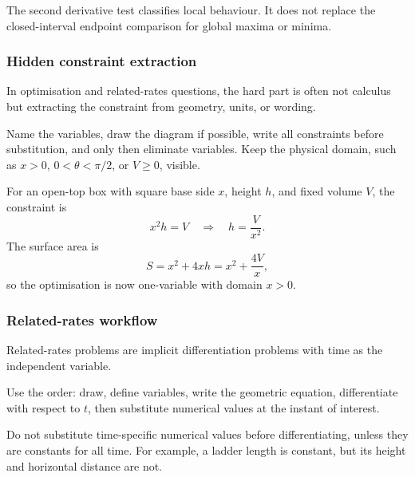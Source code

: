 \begin{commonmistake}
The second derivative test classifies local behaviour.  It does not replace the
closed-interval endpoint comparison for global maxima or minima.
\end{commonmistake}

\newpage
\subsubsection{Hidden constraint extraction}
\begin{extension}
In optimisation and related-rates questions, the hard part is often not
calculus but extracting the constraint from geometry, units, or wording.
\end{extension}

\begin{examtip}
Name the variables, draw the diagram if possible, write all constraints before
substitution, and only then eliminate variables.  Keep the physical domain, such
as \(x>0\), \(0<\theta<\pi/2\), or \(V\ge0\), visible.
\end{examtip}

\begin{examplebox}[title={Box With Fixed Volume}]
For an open-top box with square base side \(x\), height \(h\), and fixed volume
\(V\), the constraint is
\[
x^2h=V\quad\Rightarrow\quad h=\frac{V}{x^2}.
\]
The surface area is
\[
S=x^2+4xh=x^2+\frac{4V}{x},
\]
so the optimisation is now one-variable with domain \(x>0\).
\end{examplebox}

\newpage
\subsubsection{Related-rates workflow}
\begin{extension}
Related-rates problems are implicit differentiation problems with time as the
independent variable.
\end{extension}

\begin{examtip}
Use the order: draw, define variables, write the geometric equation, differentiate
with respect to \(t\), then substitute numerical values at the instant of interest.
\end{examtip}

\begin{commonmistake}
Do not substitute time-specific numerical values before differentiating, unless
they are constants for all time.  For example, a ladder length is constant, but
its height and horizontal distance are not.
\end{commonmistake}

